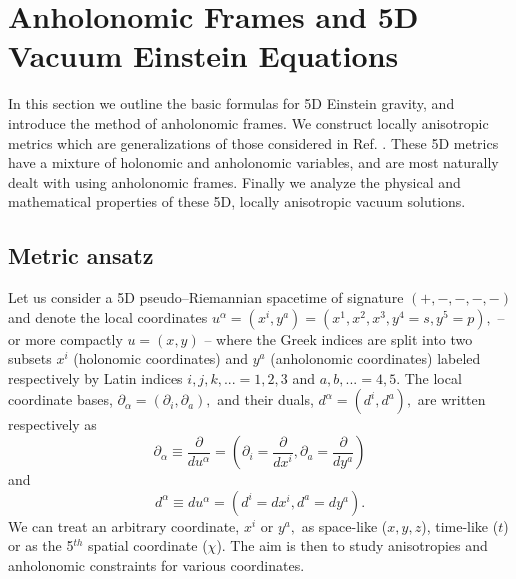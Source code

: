 \documentclass[a4paper,preprint,prabib,aps]{revtex4}
\begin{document}
\section{Anholonomic Frames and 5D Vacuum Einstein Equations}

In this section we outline the basic formulas for 5D Einstein gravity, and
introduce the method of anholonomic frames. We construct locally anisotropic
metrics which are generalizations of those considered in Ref. \cite{vsbd}.
These 5D metrics have a mixture of holonomic and anholonomic variables, and
are most naturally dealt with using anholonomic frames. Finally we analyze
the physical and mathematical properties of these 5D, locally anisotropic
vacuum solutions.

\subsection{Metric ansatz}

Let us consider a 5D pseudo--Riemannian spacetime of signature $(+,-,-,-,-)$
and denote the local coordinates $u^\alpha
=(x^i,y^a)=(x^1,x^2,x^3,y^4=s,y^5=p),$ -- or more compactly $u=(x,y)$ --
where the Greek indices are split into two subsets $x^i$ (holonomic
coordinates) and $y^a$ (anholonomic coordinates) labeled respectively by
Latin indices $i,j,k,...=1,2,3$ and $a,b,...=4,5$. The local coordinate
bases, $\partial _\alpha =(\partial _i,\partial _a),$ and their duals, $%
d^\alpha =\left( d^i,d^a\right) ,$ are written respectively as
\begin{equation}
\partial _\alpha \equiv \frac \partial {du^\alpha }=(\partial _i=\frac %
\partial {dx^i},\partial _a=\frac \partial {dy^a})  \label{pder}
\end{equation}
and
\begin{equation}
d^\alpha \equiv du^\alpha =(d^i=dx^i,d^a=dy^a).  \label{pdif}
\end{equation}
We can treat an arbitrary coordinate, $x^i$ or $y^a,$ as space-like ($x, y, z
$), time-like ($t$) or as the 5$^{th}$ spatial coordinate ($\chi$). The aim
is then to study anisotropies and anholonomic constraints for various
coordinates.
\end{document}
